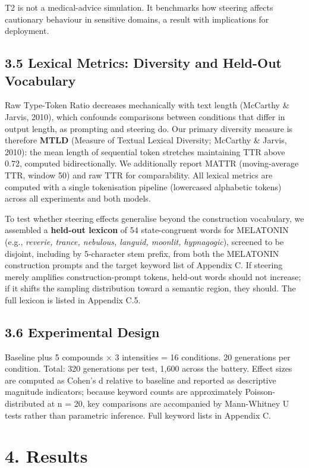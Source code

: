 \documentclass[11pt,a4paper]{article}
\begin{document}
T2 is not a medical-advice simulation. It benchmarks how steering affects cautionary behaviour in sensitive domains, a result with implications for deployment.

\subsection*{3.5 Lexical Metrics: Diversity and Held-Out Vocabulary}

Raw Type-Token Ratio decreases mechanically with text length (McCarthy \& Jarvis, 2010), which confounds comparisons between conditions that differ in output length, as prompting and steering do. Our primary diversity measure is therefore \textbf{MTLD} (Measure of Textual Lexical Diversity; McCarthy \& Jarvis, 2010): the mean length of sequential token stretches maintaining TTR above 0.72, computed bidirectionally. We additionally report MATTR (moving-average TTR, window 50) and raw TTR for comparability. All lexical metrics are computed with a single tokenisation pipeline (lowercased alphabetic tokens) across all experiments and both models.

To test whether steering effects generalise beyond the construction vocabulary, we assembled a \textbf{held-out lexicon} of 54 state-congruent words for MELATONIN (e.g., \emph{reverie, trance, nebulous, languid, moonlit, hypnagogic}), screened to be disjoint, including by 5-character stem prefix, from both the MELATONIN construction prompts and the target keyword list of Appendix C. If steering merely amplifies construction-prompt tokens, held-out words should not increase; if it shifts the sampling distribution toward a semantic region, they should. The full lexicon is listed in Appendix C.5.

\subsection*{3.6 Experimental Design}

Baseline plus 5 compounds × 3 intensities = 16 conditions. 20 generations per condition. Total: 320 generations per test, 1,600 across the battery. Effect sizes are computed as Cohen's d relative to baseline and reported as descriptive magnitude indicators; because keyword counts are approximately Poisson-distributed at n = 20, key comparisons are accompanied by Mann-Whitney U tests rather than parametric inference. Full keyword lists in Appendix C.

\section*{4. Results}
\end{document}
